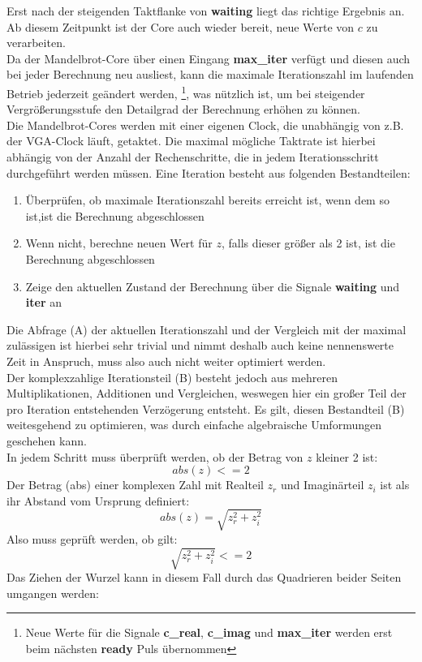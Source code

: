 \documentclass[a4paper,12pt,onesided]{report}
\begin{document}
Erst nach der steigenden Taktflanke von \textbf{waiting} liegt das richtige Ergebnis an.
Ab diesem Zeitpunkt ist der Core auch wieder bereit, neue Werte von $c$ zu verarbeiten.\\
Da der Mandelbrot-Core über einen Eingang \textbf{max\_iter} verfügt und diesen auch bei jeder Berechnung neu ausliest, kann die maximale Iterationszahl im laufenden Betrieb jederzeit geändert werden,
\footnote{Neue Werte für die Signale \textbf{c\_real}, \textbf{c\_imag} und \textbf{max\_iter} werden erst beim nächsten \textbf{ready} Puls übernommen}, was nützlich ist, um bei steigender Vergrößerungsstufe den Detailgrad der Berechnung erhöhen zu können.\\
Die Mandelbrot-Cores werden mit einer eigenen Clock, die unabhängig von z.B. der VGA-Clock läuft, getaktet.
Die maximal mögliche Taktrate ist hierbei abhängig von der Anzahl der Rechenschritte, die in jedem Iterationsschritt durchgeführt werden müssen.
Eine Iteration besteht aus folgenden Bestandteilen:
\begin{enumerate}[label=(\Alph*)]
	\item Überprüfen, ob maximale Iterationszahl bereits erreicht ist, wenn dem so ist,ist die Berechnung abgeschlossen
	\item Wenn nicht, berechne neuen Wert für $z$, falls dieser größer als 2 ist, ist die Berechnung abgeschlossen
	\item Zeige den aktuellen Zustand der Berechnung über die Signale \textbf{waiting} und \textbf{iter} an
\end{enumerate}
Die Abfrage (A) der aktuellen Iterationszahl und der Vergleich mit der maximal zulässigen ist hierbei sehr trivial und nimmt deshalb auch keine nennenswerte Zeit in Anspruch, muss also auch nicht weiter optimiert werden.\\
Der komplexzahlige Iterationsteil (B) besteht jedoch aus mehreren Multiplikationen, Additionen und Vergleichen, weswegen hier ein großer Teil der pro Iteration entstehenden Verzögerung entsteht.
Es gilt, diesen Bestandteil (B) weitesgehend zu optimieren, was durch einfache algebraische Umformungen geschehen kann.\\
In jedem Schritt muss überprüft werden, ob der Betrag von $z$ kleiner 2 ist:
\[abs(z) <= 2\]
Der Betrag (abs) einer komplexen Zahl mit Realteil $z_r$ und Imaginärteil $z_i$ ist als ihr Abstand vom Ursprung definiert:
\[abs(z) = \sqrt{z_r^2 + z_i^2}\]
Also muss geprüft werden, ob gilt:
\[\sqrt{z_r^2 + z_i^2} <= 2\]
Das Ziehen der Wurzel kann in diesem Fall durch das Quadrieren beider Seiten umgangen werden:
\end{document}
